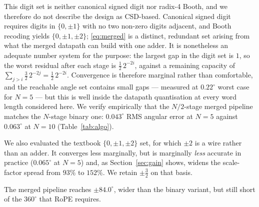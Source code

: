 This digit set is neither canonical signed digit nor radix-4 Booth, and we
therefore do not describe the design as CSD-based. Canonical signed digit
requires digits in $\{0, \pm 1\}$ with no two non-zero digits adjacent, and
Booth recoding yields $\{0, \pm 1, \pm 2\}$; \eqref{eq:merged} is a distinct,
redundant set arising from what the merged datapath can build with one adder.
It is nonetheless an adequate number system for the purpose: the largest gap in
the digit set is $1$, so the worst residual after each stage is
$\tfrac{1}{2}\,2^{-2i}$, against a remaining capacity of
$\sum_{j>i}\tfrac{3}{2}\,2^{-2j} = \tfrac{1}{2}\,2^{-2i}$. Convergence is
therefore marginal rather than comfortable, and the reachable angle set
contains small gaps --- measured at $0.22^{\circ}$ worst case for $N = 5$ ---
but this is well inside the datapath quantisation at every word length
considered here. We verify empirically that the $N/2$-stage merged pipeline
matches the $N$-stage binary one: $0.043^{\circ}$ RMS angular error at $N = 5$
against $0.063^{\circ}$ at $N = 10$ (Table~\ref{tab:algo}).

We also evaluated the textbook $\{0, \pm 1, \pm 2\}$ set, for which $\pm 2$ is a
wire rather than an adder. It converges less marginally, but is marginally
\emph{less} accurate in practice ($0.065^{\circ}$ at $N = 5$) and, as
Section~\ref{sec:gain} shows, widens the scale-factor spread from $93\%$ to
$152\%$. We retain $\pm\tfrac{3}{2}$ on that basis.

The merged pipeline reaches $\pm 84.0^{\circ}$, wider than the binary variant,
but still short of the $360^{\circ}$ that RoPE requires.
